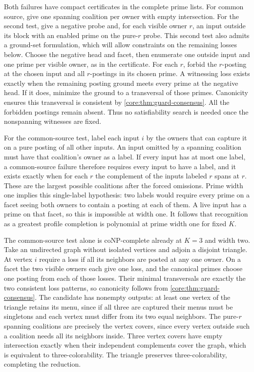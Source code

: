 Both failures have compact certificates in the complete prime
lists. For common source, give one spanning coalition per owner
with empty intersection. For the second test, give a negative
probe and, for each visible owner $r$, an input outside its block
with an enabled prime on the pure-$r$ probe. This second
test also admits a ground-set formulation, which will allow
constraints on the remaining losses below.
Choose the negative head and facet, then enumerate one
outside input and one prime per visible owner, as in the
certificate. For each $r$, forbid the $r$-posting at the
chosen input and all $r$-postings in its chosen prime.
A witnessing loss exists exactly when the remaining posting
ground meets every prime at the negative head. If it does,
minimize the ground to a transversal of those primes.
Canonicity ensures this transversal is consistent by
\cref{core:thm:guard-consensus}. All the forbidden postings
remain absent. Thus no satisfiability search is needed once
the nonspanning witnesses are fixed.

For the common-source test, label each input $i$ by the owners
that can capture it on a pure posting of all other inputs.
An input omitted by a spanning coalition must have that
coalition's owner as a label. If every input has at most one
label, a common-source failure therefore requires every input
to have a label, and it exists exactly when for each $r$ the
complement of the inputs labeled $r$ spans at $r$. These are
the largest possible coalitions after the forced omissions.
Prime width one implies this single-label hypothesis: two
labels would require every prime on a facet seeing both owners
to contain a posting at each of them. A live input has a prime
on that facet, so this is impossible at width one. It follows
that recognition as a greatest profile completion is polynomial
at prime width one for fixed $K$.

The common-source test alone is coNP-complete already at
$K=3$ and width two. Take an undirected graph without isolated
vertices and adjoin a disjoint triangle. At vertex $i$ require
a loss if all its neighbors are posted at any one owner.
On a facet the two visible owners each give one loss, and the
canonical primes choose one posting from each of those losses.
Their minimal transversals are exactly the two consistent loss
patterns, so canonicity follows from
\cref{core:thm:guard-consensus}. The candidate has nonempty
outputs: at least one vertex of the triangle retains its menu,
since if all three are captured their menus must be singletons
and each vertex must differ from its two equal neighbors.
The pure-$r$ spanning coalitions are precisely the vertex
covers, since every vertex outside such a coalition needs
all its neighbors inside. Three vertex covers have empty
intersection exactly when their independent complements cover
the graph, which is equivalent to three-colorability. The
triangle preserves three-colorability, completing the reduction.

